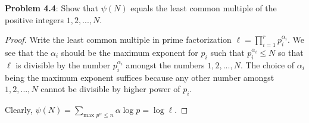 \documentclass[12pt]{article}
\begin{document}
\fi

\textbf{Problem 4.4}: Show that $\psi(N)$ equals the least common multiple of the positive integers $1, 2, ..., N$.

\begin{proof}
Write the least common multiple in prime factorization $\ell = \prod_{i=1}^{r} p_i^{\alpha_i}$. We see that the $\alpha_i$ should be the maximum exponent for $p_i$ such that $p_i^{\alpha_i} \leq N$ so that $\ell$ is divisible by the number $p_i^{\alpha_i}$ amongst the numbers $1, 2, ..., N$. The choice of $\alpha_i$ being the maximum exponent suffices because any other number amongst $1, 2, ..., N$ cannot be divisible by higher power of $p_i$.

Clearly, $\psi(N) = \sum_{\text{max } p^\alpha \leq n} \alpha \log p = \log \ell$.
\end{proof}

\unless\ifdefined\IsMainDocument
\end{document}
